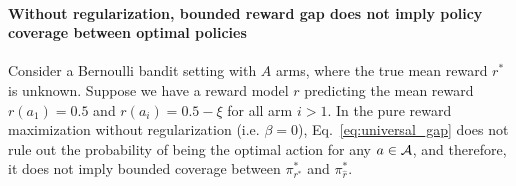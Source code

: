 {    \paragraph{Without regularization, bounded reward gap does not imply policy coverage between optimal policies}
    Consider a Bernoulli bandit setting with $A$ arms, where the true mean reward $r^*$ is unknown.
    Suppose we have a reward model $r$ predicting the mean reward $r(a_1) = 0.5$ and $r(a_i) = 0.5 - \xi$ for all arm $i > 1$.
    In the pure reward maximization without regularization (i.e. $\beta = 0$), Eq.~\eqref{eq:universal_gap} does not rule out the probability of being the optimal action for any $a\in\mathcal{A}$, and therefore, it does not imply bounded coverage between $\pi^*_{r^*}$ and $\pi^*_{\hat r}$.


}
\fi